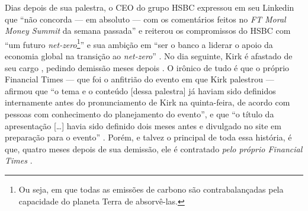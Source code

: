 \documentclass[12pt]{article}
\numberwithin{equation}{section}
\theoremstyle{plain}
\theoremstyle{definition}
\theoremstyle{remark}
\begin{document}
Dias depois de sua palestra, o CEO do grupo HSBC expressou em seu Linkedin que ``não concorda --- em absoluto --- com os comentários feitos no \textit{FT Moral Money Summit} da semana passada'' e reiterou os compromissos do HSBC com ``um futuro \textit{net-zero}\footnote{Ou seja, em que todas as emissões de carbono são contrabalançadas pela capacidade do planeta Terra de absorvê-las.}'' e sua ambição em ``ser o banco a liderar o apoio da economia global na transição ao \textit{net-zero}'' \parencite{25PublicacaoLinkedIn}. No dia seguinte, Kirk é afastado de seu cargo \parencite{Makortoff2022}, pedindo demissão meses depois \parencite{Reuters2022}. O irônico de tudo é que o próprio Financial Times --- que foi o anfitrião do evento em que Kirk palestrou --- afirmou que ``o tema e o conteúdo {[}dessa palestra{]} já haviam sido definidos internamente antes do pronunciamento de Kirk na quinta-feira, de acordo com pessoas com conhecimento do planejamento do evento'', e que ``o título da apresentação {[}\ldots{]} havia sido definido dois meses antes e divulgado no site em preparação para o evento'' \parencite{Walker2022}. Porém, e talvez o principal de toda essa história, é que, quatro meses depois de sua demissão, ele é contratado \textit{pelo próprio Financial Times} \parencite{FinancialTimes2022}. 


\end{document}

